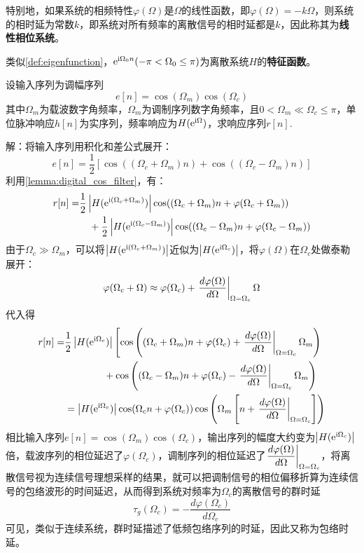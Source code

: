 特别地，如果系统的相频特性$\varphi(\Omega)$是$\Omega$的线性函数，即$\varphi(\Omega)=-k\Omega$，则系统的相时延为常数$k$，即系统对所有频率的离散信号的相时延都是$k$，因此称其为\textbf{线性相位系统}。

类似\cref{def:eigenfunction}，$\mathrm{e}^{\mathrm{i}\Omega_0 n}(-\pi<\Omega_0\le\pi)$为离散系统$H$的\textbf{特征函数}。

\begin{example}[群时延]
    设输入序列为调幅序列
    $$e[n]=\cos(\Omega_m)\cos(\Omega_c)$$
    其中$\Omega_m$为载波数字角频率，$\Omega_m$为调制序列数字角频率，且$0<\Omega_m\ll\Omega_c\le\pi$，单位脉冲响应$h[n]$为实序列，频率响应为$H(\mathrm{e}^{\mathrm{i}\Omega})$，求响应序列$r[n]$.

    解：将输入序列用积化和差公式展开：
    $$e[n]=\frac{1}{2}[\cos((\Omega_c+\Omega_m)n)+\cos((\Omega_c-\Omega_m)n)]$$
    利用\cref{lemma:digital_cos_filter}，有：
    \begin{align*}
        r[n]=&\frac{1}{2}\left|H(\mathrm{e}^{\mathrm{i}(\Omega_c+\Omega_m)})\right|\cos((\Omega_c+\Omega_m)n+\varphi(\Omega_c+\Omega_m))\\
        &\quad+\frac{1}{2}\left|H(\mathrm{e}^{\mathrm{i}(\Omega_c-\Omega_m)})\right|\cos((\Omega_c-\Omega_m)n+\varphi(\Omega_c-\Omega_m))
    \end{align*}
    由于$\Omega_c\gg\Omega_m$，可以将$\left|H(\mathrm{e}^{\mathrm{i}(\Omega_c+\Omega_m)})\right|$近似为$\left|H(\mathrm{e}^{\mathrm{i}\Omega_c})\right|$，将$\varphi(\Omega)$在$\Omega_c$处做泰勒展开：
    $$\varphi(\Omega_c+\Omega)\approx\varphi(\Omega_c)+\left.\frac{d\varphi(\Omega)}{d\Omega}\right|_{\Omega=\Omega_c}^{}\Omega$$
    代入得
    \begin{align*}
        r[n]=&\frac{1}{2}\left|H(\mathrm{e}^{\mathrm{i}\Omega_c})\right|\left[\cos\left((\Omega_c+\Omega_m)n+\varphi(\Omega_c)+\left.\frac{d\varphi(\Omega)}{d\Omega}\right|_{\Omega=\Omega_c}^{}\Omega_m\right)\right.\\
        &\qquad\qquad+\cos\left((\Omega_c-\Omega_m)n+\varphi(\Omega_c)-\left.\frac{d\varphi(\Omega)}{d\Omega}\right|_{\Omega=\Omega_c}^{}\Omega_m\right)\\
        &=\left|H(\mathrm{e}^{\mathrm{i}\Omega_c})\right|\cos(\Omega_c n+\varphi(\Omega_c))\cos\left(\Omega_m\left[n+\left.\frac{d\varphi(\Omega)}{d\Omega}\right|_{\Omega=\Omega_c}^{}\right]\right)
    \end{align*}
    相比输入序列$e[n]=\cos(\Omega_m)\cos(\Omega_c)$，输出序列的幅度大约变为$\left|H(\mathrm{e}^{\mathrm{i}\Omega_c})\right|$倍，载波序列的相位延迟了$\varphi(\Omega_c)$，调制序列的相位延迟了$\left.\dfrac{d\varphi(\Omega)}{d\Omega}\right|_{\Omega=\Omega_c}^{}$，将离散信号视为连续信号理想采样的结果，就可以把调制信号的相位偏移折算为连续信号的包络波形的时间延迟，从而得到系统对频率为$\Omega_c$的离散信号的群时延
    $$\tau_g(\Omega_c)=-\frac{d\varphi(\Omega_c)}{d\Omega_c}$$
    可见，类似于连续系统，群时延描述了低频包络序列的时延，因此又称为包络时延。
\end{example}

